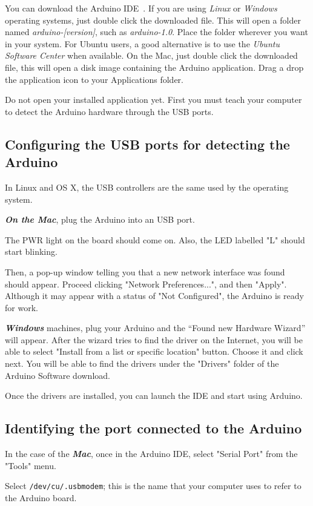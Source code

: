 You can download the Arduino IDE~\emph{}. If you are using \emph{Linux} or \emph{Windows} operating systems, just double click the downloaded file. This will open a folder named \emph{arduino-[version]}, such as \emph{arduino-1.0}. Place the folder wherever you want in your system. For Ubuntu users, a good alternative is to use the \emph{Ubuntu Software Center} when available. On the Mac, just double click the downloaded file, this will open a disk image containing the Arduino application. Drag a drop the application icon to your Applications folder.

Do not open your installed application yet. First you must teach your computer to detect the Arduino hardware through the USB ports.

\subsection{Configuring the USB ports for detecting the Arduino}
In Linux and OS X, the USB controllers are the same used by the operating system.

\emph{\bf{On the Mac}}, plug the Arduino into an USB port.

The PWR light on the board should come on. Also, the LED labelled "L" should start blinking.

Then, a pop-up window telling you that a new network interface was found should appear. Proceed clicking "Network Preferences...", and then "Apply". Although it may appear with a status of "Not Configured", the Arduino is ready for work.

\emph{\bf{Windows}} machines, plug your Arduino and the ``Found new Hardware Wizard'' will appear. After the wizard tries to find the driver on the Internet, you will be able to select "Install from a list or specific location" button. Choose it and click next. You will be able to find the drivers under the "Drivers" folder of the Arduino Software download.

Once the drivers are installed, you can launch the IDE and start using Arduino.

\subsection{Identifying the port connected to the Arduino}
In the case of the \emph{\bf{Mac}}, once in the Arduino IDE, select "Serial Port" from the "Tools" menu. 

Select \texttt{/dev/cu/.usbmodem}; this is the name that your computer uses to refer to the Arduino board.

